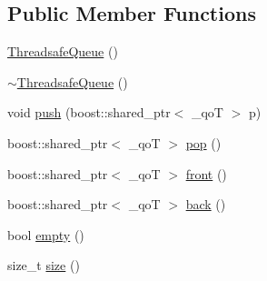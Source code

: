 \subsection*{Public Member Functions}
\begin{DoxyCompactItemize}
\item 
\hyperlink{classkisscpp_1_1_threadsafe_queue_a77e614d9676f60c19e0eaa4c50f3f804}{Threadsafe\-Queue} ()
\item 
\hyperlink{classkisscpp_1_1_threadsafe_queue_ac561918dd6c95c7334b2e56917a74567}{$\sim$\-Threadsafe\-Queue} ()
\item 
void \hyperlink{classkisscpp_1_1_threadsafe_queue_aaca1e00d06c1eb749f6a293d1ca07a7d}{push} (boost\-::shared\-\_\-ptr$<$ \-\_\-qo\-T $>$ p)
\item 
boost\-::shared\-\_\-ptr$<$ \-\_\-qo\-T $>$ \hyperlink{classkisscpp_1_1_threadsafe_queue_a0bbccaf15a770fd0b3b16b85ed957c8d}{pop} ()
\item 
boost\-::shared\-\_\-ptr$<$ \-\_\-qo\-T $>$ \hyperlink{classkisscpp_1_1_threadsafe_queue_abb61873eafe8958aad8f6bca8f00a4b3}{front} ()
\item 
boost\-::shared\-\_\-ptr$<$ \-\_\-qo\-T $>$ \hyperlink{classkisscpp_1_1_threadsafe_queue_ad6f26dad2d2e9111c8c06f3dbda04c76}{back} ()
\item 
bool \hyperlink{classkisscpp_1_1_threadsafe_queue_a3fa0826aed79b1164a45eb0517248819}{empty} ()
\item 
size\-\_\-t \hyperlink{classkisscpp_1_1_threadsafe_queue_a8c89a9c02a8a05ae2336f27b57502c87}{size} ()
\end{DoxyCompactItemize}


